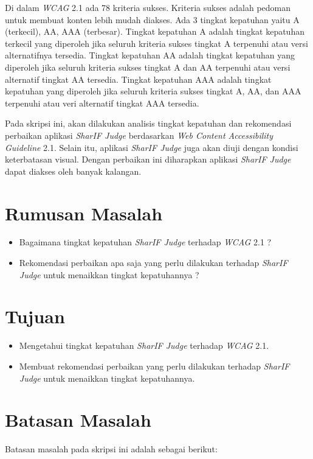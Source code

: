 Di dalam \textit{WCAG} 2.1 ada 78 kriteria sukses. Kriteria sukses adalah pedoman untuk membuat konten lebih mudah diakses. Ada 3 tingkat kepatuhan yaitu A (terkecil), AA, AAA (terbesar). Tingkat kepatuhan A adalah tingkat kepatuhan terkecil yang diperoleh jika seluruh kriteria sukses tingkat A terpenuhi atau versi alternatifnya tersedia. Tingkat kepatuhan AA adalah tingkat kepatuhan yang diperoleh jika seluruh kriteria sukses tingkat A dan AA terpenuhi atau versi alternatif tingkat AA tersedia. Tingkat kepatuhan AAA adalah tingkat kepatuhan yang diperoleh jika seluruh kriteria sukses tingkat A, AA, dan AAA terpenuhi atau veri alternatif tingkat AAA tersedia.

Pada skripsi ini, akan dilakukan analisis tingkat kepatuhan dan rekomendasi perbaikan aplikasi \textit{SharIF Judge} berdasarkan \textit{Web Content Accessibility Guideline} 2.1. Selain itu, aplikasi \textit{SharIF Judge} juga akan diuji dengan kondisi keterbatasan visual. Dengan perbaikan ini diharapkan aplikasi \textit{SharIF Judge} dapat diakses oleh banyak kalangan.

\section{Rumusan Masalah}
\label{sec:rumusan}
\begin{itemize}
	\item Bagaimana tingkat kepatuhan \textit{SharIF Judge} terhadap \textit{WCAG} 2.1 ?
	\item Rekomendasi perbaikan apa saja yang perlu dilakukan terhadap \textit{SharIF Judge} untuk menaikkan tingkat kepatuhannya ?
\end{itemize}

\section{Tujuan}
\label{sec:tujuan}
\begin{itemize}
	\item Mengetahui tingkat kepatuhan \textit{SharIF Judge} terhadap \textit{WCAG} 2.1.
	\item Membuat rekomendasi perbaikan yang perlu dilakukan terhadap \textit{SharIF Judge} untuk menaikkan tingkat kepatuhannya.
\end{itemize} 

\section{Batasan Masalah}
\label{sec:batasan}
Batasan masalah pada skripsi ini adalah sebagai berikut:

